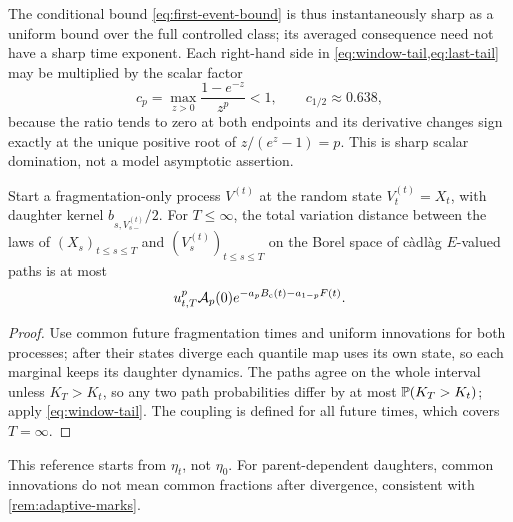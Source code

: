 The conditional bound \eqref{eq:first-event-bound} is thus
instantaneously sharp as a uniform bound over the full controlled
class; its averaged consequence need not have a sharp time exponent.
Each right-hand side in \cref{eq:window-tail,eq:last-tail} may be
multiplied by the scalar factor
\begin{equation}
 c_p=\max_{z>0}\frac{1-e^{-z}}{z^p}<1,\qquad c_{1/2}\approx0.638,
 \label{eq:scalar-tail-factor}
\end{equation}
because the ratio tends to zero at both endpoints and its derivative
changes sign exactly at the unique positive root of $z/(e^z-1)=p$.
This is sharp scalar domination, not a model asymptotic assertion.

\begin{corollary}
\label{cor:future-path-TV}
Start a fragmentation-only process $V^{(t)}$ at the random state
$V^{(t)}_t=X_t$, with daughter kernel $b_{s,V^{(t)}_{s-}}/2$.
For $T\leq\infty$, the total variation distance between the laws of
$(X_s)_{t\leq s\leq T}$ and $(V^{(t)}_s)_{t\leq s\leq T}$ on the Borel
space of c\`adl\`ag $E$-valued paths is at most
\begin{equation}
 u_{t,T}^p\mathcal A_p(0)e^{-a_pB_{\mathrm c}(t)-a_{1-p}F(t)}.
 \label{eq:future-path-TV}
\end{equation}
\end{corollary}

\begin{proof}
Use common future fragmentation times and uniform innovations for
both processes; after their states diverge each quantile map uses its
own state, so each marginal keeps its daughter dynamics. The paths
agree on the whole interval unless $K_T>K_t$, so any two path
probabilities differ by at most $\mathbb P(K_T>K_t)$; apply
\eqref{eq:window-tail}. The coupling is defined for all future times,
which covers $T=\infty$.
\end{proof}

This reference starts from $\eta_t$, not $\eta_0$. For
parent-dependent daughters, common innovations do not mean common
fractions after divergence, consistent with \cref{rem:adaptive-marks}.

